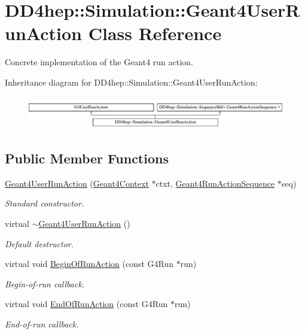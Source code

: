 \hypertarget{class_d_d4hep_1_1_simulation_1_1_geant4_user_run_action}{}\section{D\+D4hep\+:\+:Simulation\+:\+:Geant4\+User\+Run\+Action Class Reference}
\label{class_d_d4hep_1_1_simulation_1_1_geant4_user_run_action}


Concrete implementation of the Geant4 run action.  


Inheritance diagram for D\+D4hep\+:\+:Simulation\+:\+:Geant4\+User\+Run\+Action\+:\begin{figure}[H]
\begin{center}
\leavevmode
\includegraphics[height=1.443299cm]{class_d_d4hep_1_1_simulation_1_1_geant4_user_run_action}
\end{center}
\end{figure}
\subsection*{Public Member Functions}
\begin{DoxyCompactItemize}
\item 
\hyperlink{class_d_d4hep_1_1_simulation_1_1_geant4_user_run_action_a4619583991588e3f0e3d51da6082bac3}{Geant4\+User\+Run\+Action} (\hyperlink{class_d_d4hep_1_1_simulation_1_1_geant4_context}{Geant4\+Context} $\ast$ctxt, \hyperlink{class_d_d4hep_1_1_simulation_1_1_geant4_run_action_sequence}{Geant4\+Run\+Action\+Sequence} $\ast$seq)
\begin{DoxyCompactList}\small\item\em Standard constructor. \end{DoxyCompactList}\item 
virtual \hyperlink{class_d_d4hep_1_1_simulation_1_1_geant4_user_run_action_a5b3bda44a46cc253d0c1d343d4f28738}{$\sim$\+Geant4\+User\+Run\+Action} ()
\begin{DoxyCompactList}\small\item\em Default destructor. \end{DoxyCompactList}\item 
virtual void \hyperlink{class_d_d4hep_1_1_simulation_1_1_geant4_user_run_action_a42955d00dd5a101ec3e9594645eac6e5}{Begin\+Of\+Run\+Action} (const G4\+Run $\ast$run)
\begin{DoxyCompactList}\small\item\em Begin-\/of-\/run callback. \end{DoxyCompactList}\item 
virtual void \hyperlink{class_d_d4hep_1_1_simulation_1_1_geant4_user_run_action_acb9977f8d385a4f6523617dafea602bb}{End\+Of\+Run\+Action} (const G4\+Run $\ast$run)
\begin{DoxyCompactList}\small\item\em End-\/of-\/run callback. \end{DoxyCompactList}\end{DoxyCompactItemize}
